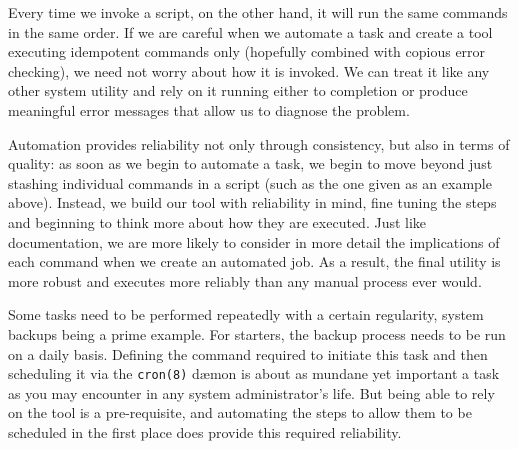 Every time we invoke a script, on the other hand, it
will run the same commands in the same order.  If we
are careful when we automate a task and create a tool
executing idempotent commands only (hopefully combined
with copious error checking), we need not worry about
how it is invoked.  We can treat it like any other
system utility and rely on it running either to
completion or produce meaningful error messages that
allow us to diagnose the problem.

Automation provides reliability not only through
consistency, but also in terms of quality: as soon as
we begin to automate a task, we begin to move beyond
just stashing individual commands in a script (such as
the one given as an example above).  Instead, we build
our tool with reliability in mind, fine tuning the
steps and beginning to think more about how they are
executed.  Just like documentation, we are more likely
to consider in more detail the implications of each
command when we create an automated job.  As a result,
the final utility is more robust and executes more
reliably than any manual process ever would.

Some tasks need to be performed repeatedly with a
certain regularity, system backups being a prime example.
For starters, the backup process needs to be
run on a daily basis.  Defining the command required
to initiate this task and then scheduling it via the
{\tt cron(8)} d\ae mon is about as mundane yet
important a task as you may encounter in any system
administrator's life.  But being able to rely on the
tool is a pre-requisite, and automating the steps to
allow them to be scheduled in the first place does
provide this required reliability.

